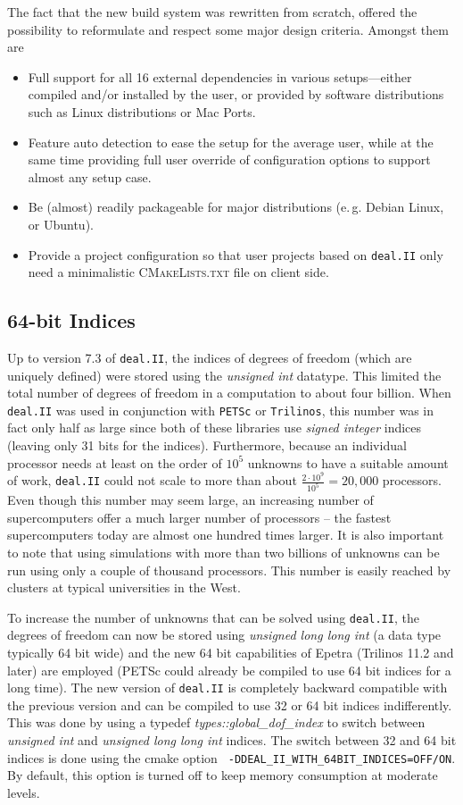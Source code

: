 \documentclass{siamltex}
\newcommand{\specialword}[1]{\texttt{#1}}
\newcommand{\dealii}{{\specialword{deal.II}}}
\newcommand{\trilinos}{{\specialword{Trilinos}}}
\newcommand{\petsc}{\specialword{PETSc}}
\begin{document}
The fact that the new build system was rewritten from scratch, offered the
possibility to reformulate and respect some major design criteria. Amongst
them are
\begin{itemize}
  \item Full support for all 16 external dependencies in various
    setups---either compiled and/or installed by the user, or provided by
    software distributions such as Linux distributions or Mac Ports.
  \item Feature auto detection to ease the setup for the average user,
    while at the same time providing full user override of configuration
    options to support almost any setup case.
  \item Be (almost) readily packageable for major distributions (e.\,g.
    Debian Linux, or Ubuntu).
  \item Provide a project configuration so that user projects based on
    \dealii{} only need a minimalistic \textsc{CMakeLists.txt} file on
    client side.
\end{itemize}

\subsection{64-bit Indices}\label{sec:64bit}

Up to version 7.3 of \dealii{}, the indices of degrees of freedom (which
are uniquely defined) were stored using the \emph{unsigned int} datatype. This
limited the total number of degrees of freedom in a computation to about four billion. When \dealii{}
was used in conjunction with \petsc{} or \trilinos{}, this number was in
fact only half as large since both of these libraries use \emph{signed
integer} indices (leaving only 31 bits for the indices). Furthermore, because an individual processor needs at
least on the order of $10^5$ unknowns to have a suitable amount of work,
\dealii{} could not scale to more than about $\frac{2\cdot 10^9}{10^5}=20,000$
processors. Even though this number may seem large, an increasing number of
supercomputers offer a much larger number of processors -- the fastest
supercomputers today are almost one hundred times larger. It is also
important to note that using simulations with more than two billions of
unknowns can be run using only a couple of thousand processors. This number
is easily reached by clusters at typical universities in the West.

To increase the number of unknowns that can be solved using \dealii{}, the
degrees of freedom can now be stored using \emph{unsigned long long int} (a
data type typically 64 bit wide) and the new 64 bit capabilities of Epetra
(Trilinos 11.2 and later) are employed (PETSc could already be compiled to use 64
bit indices for a long time). The new version of \dealii{} is completely
backward compatible with the previous version and can be compiled to use 32
or 64 bit indices indifferently. This was done by using a typedef
\emph{types::global\_dof\_index} to switch between \emph{unsigned int} and
\emph{unsigned long long int} indices. The switch between 32 and 64 bit
indices is done using the cmake option \hbox{\tt
  -DDEAL\_II\_WITH\_64BIT\_INDICES=OFF/ON}. By default, this option is turned
off to keep memory consumption at moderate levels. 
\end{document}
